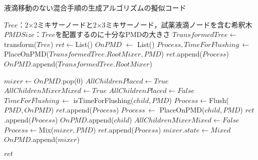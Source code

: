 \begin{algorithm}[tbp]
 \caption{液滴移動のない混合手順の生成アルゴリズムの擬似コード}\label{alg:prop}
 \begin{algorithmic}[1]
     \Require $\mathit{Tree}$：2$\times$2ミキサーノードと2$\times$3ミキサーノード，試薬液滴ノードを含む希釈木 
     \Require $\mathit{PMDSize}$：$\mathit{Tree}$を配置するのに十分なPMDの大きさ
     \State $\mathit{TransformedTree} \gets$ transform($Tree$) \label{transform_pseudo} \State $\mathit{ret} \gets $List() \label{xntm_pseudo}
     \State $\mathit{OnPMD}$ $\gets$ List() \label{xntm}
     \State $\mathit{Process,TimeForFlushing}\,\gets $  PlaceOnPMD($\mathit{TransformedTree.RootMixer,PMD}$)
     \State $\mathit{ret}$.append($\mathit{Process}$)
     \State $\mathit{OnPMD}$.append($TransformedTree.RootMixer$)
    
    \State {}
        \State$\mathit{mixer} \gets  \mathit{OnPMD}$.pop(0)
        \State $\mathit{AllChildrenPlaced}\gets\mathit{True}$
        \State $\mathit{AllChildrenMixerMixed}\gets\mathit{True}$
                \State$\mathit{AllChildrenPlaced \gets False}$
                \State $\mathit{TimeForFlushing}\, \gets$  isTimeForFlushing($\mathit{child,PMD}$) 
                    \State $\mathit{Process}\gets$Flush($\mathit{PMD,OnPMD}$)
                    \State $\mathit{ret}$.append($\mathit{Process}$)
                \EndIf
                \State $\mathit{Process}\, \gets$  PlaceOnPMD($\mathit{child,PMD}$)
                \State $\mathit{ret}$.append($\mathit{Process}$)
                \State $\mathit{OnPMD}$.append($\mathit{child}$) 
            \EndIf 
                \State $\mathit{AllChildrenMixerMixed}\gets\mathit{False}$
            \EndIf 
        \EndFor 
            \State$\mathit{Process}\gets$Mix($\mathit{mixer,PMD}$)
            \State $\mathit{ret}$.append($\mathit{Process}$)
            \State$\mathit{mixer.state} \gets \mathit{Mixed}$ 
        \EndIf
        \State$\mathit{OnPMD}$.append($\mathit{mixer}$)
    \EndWhile 

     \Return $\mathit{ret}$
 \end{algorithmic}
\end{algorithm}





